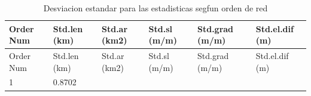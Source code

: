 \documentclass[11pt,]{article}
\begin{document}
\begin{longtable}[]{@{}llllll@{}}
\caption{\label{tablacinco}Desviacion estandar para las estadisticas
segfun orden de red}\tabularnewline
\toprule
\begin{minipage}[b]{0.13\columnwidth}\raggedright\strut
Order Num\strut
\end{minipage} & \begin{minipage}[b]{0.13\columnwidth}\raggedright\strut
Std.len (km)\strut
\end{minipage} & \begin{minipage}[b]{0.13\columnwidth}\raggedright\strut
Std.ar (km2)\strut
\end{minipage} & \begin{minipage}[b]{0.13\columnwidth}\raggedright\strut
Std.sl (m/m)\strut
\end{minipage} & \begin{minipage}[b]{0.15\columnwidth}\raggedright\strut
Std.grad (m/m)\strut
\end{minipage} & \begin{minipage}[b]{0.15\columnwidth}\raggedright\strut
Std.el.dif (m)\strut
\end{minipage}\tabularnewline
\midrule
\endfirsthead
\toprule
\begin{minipage}[b]{0.13\columnwidth}\raggedright\strut
Order Num\strut
\end{minipage} & \begin{minipage}[b]{0.13\columnwidth}\raggedright\strut
Std.len (km)\strut
\end{minipage} & \begin{minipage}[b]{0.13\columnwidth}\raggedright\strut
Std.ar (km2)\strut
\end{minipage} & \begin{minipage}[b]{0.13\columnwidth}\raggedright\strut
Std.sl (m/m)\strut
\end{minipage} & \begin{minipage}[b]{0.15\columnwidth}\raggedright\strut
Std.grad (m/m)\strut
\end{minipage} & \begin{minipage}[b]{0.15\columnwidth}\raggedright\strut
Std.el.dif (m)\strut
\end{minipage}\tabularnewline
\midrule
\endhead
\begin{minipage}[t]{0.13\columnwidth}\raggedright\strut
1\strut
\end{minipage} & \begin{minipage}[t]{0.13\columnwidth}\raggedright\strut
0.8702\strut

\end{minipage}
\end{longtable}
\end{document}
